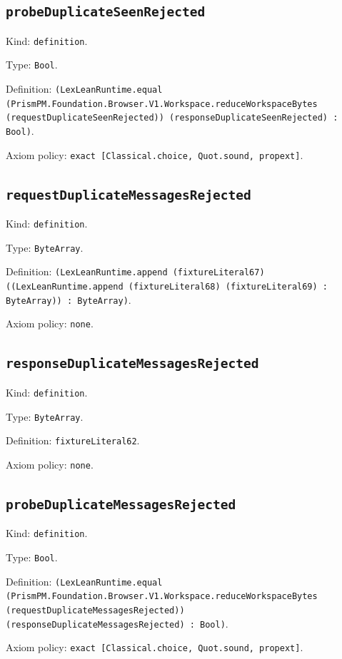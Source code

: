 \documentclass[11pt]{article}
\begin{document}
\subsection*{\texttt{probeDuplicateSeenRejected}}
\noindent Kind: \texttt{definition}.\par
\noindent Type: \texttt{Bool}.\par
\noindent Definition: \texttt{(LexLeanRuntime.equal (PrismPM.Foundation.Browser.V1.Workspace.reduceWorkspaceBytes (requestDuplicateSeenRejected)) (responseDuplicateSeenRejected) : Bool)}.\par
\noindent Axiom policy: \texttt{exact [Classical.choice, Quot.sound, propext]}.\par
\subsection*{\texttt{requestDuplicateMessagesRejected}}
\noindent Kind: \texttt{definition}.\par
\noindent Type: \texttt{ByteArray}.\par
\noindent Definition: \texttt{(LexLeanRuntime.append (fixtureLiteral67) ((LexLeanRuntime.append (fixtureLiteral68) (fixtureLiteral69) : ByteArray)) : ByteArray)}.\par
\noindent Axiom policy: \texttt{none}.\par
\subsection*{\texttt{responseDuplicateMessagesRejected}}
\noindent Kind: \texttt{definition}.\par
\noindent Type: \texttt{ByteArray}.\par
\noindent Definition: \texttt{fixtureLiteral62}.\par
\noindent Axiom policy: \texttt{none}.\par
\subsection*{\texttt{probeDuplicateMessagesRejected}}
\noindent Kind: \texttt{definition}.\par
\noindent Type: \texttt{Bool}.\par
\noindent Definition: \texttt{(LexLeanRuntime.equal (PrismPM.Foundation.Browser.V1.Workspace.reduceWorkspaceBytes (requestDuplicateMessagesRejected)) (responseDuplicateMessagesRejected) : Bool)}.\par
\noindent Axiom policy: \texttt{exact [Classical.choice, Quot.sound, propext]}.\par
\end{document}
